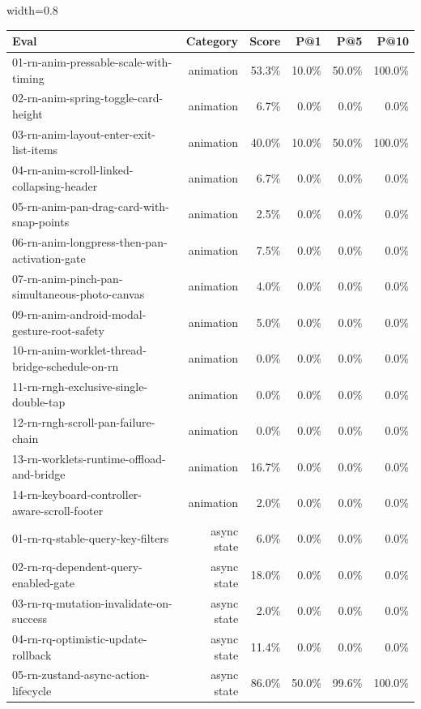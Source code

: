 \begin{table}[htbp]
\centering
\begin{adjustbox}{width=0.8\textwidth}
\begin{tabular}{lrrrrr}
\toprule
Eval & Category & Score & P@1 & P@5 & P@10 \\
\midrule
01-rn-anim-pressable-scale-with-timing & animation & 53.3\% & 10.0\% & 50.0\% & 100.0\% \\
02-rn-anim-spring-toggle-card-height & animation & 6.7\% & 0.0\% & 0.0\% & 0.0\% \\
03-rn-anim-layout-enter-exit-list-items & animation & 40.0\% & 10.0\% & 50.0\% & 100.0\% \\
04-rn-anim-scroll-linked-collapsing-header & animation & 6.7\% & 0.0\% & 0.0\% & 0.0\% \\
05-rn-anim-pan-drag-card-with-snap-points & animation & 2.5\% & 0.0\% & 0.0\% & 0.0\% \\
06-rn-anim-longpress-then-pan-activation-gate & animation & 7.5\% & 0.0\% & 0.0\% & 0.0\% \\
07-rn-anim-pinch-pan-simultaneous-photo-canvas & animation & 4.0\% & 0.0\% & 0.0\% & 0.0\% \\
09-rn-anim-android-modal-gesture-root-safety & animation & 5.0\% & 0.0\% & 0.0\% & 0.0\% \\
10-rn-anim-worklet-thread-bridge-schedule-on-rn & animation & 0.0\% & 0.0\% & 0.0\% & 0.0\% \\
11-rn-rngh-exclusive-single-double-tap & animation & 0.0\% & 0.0\% & 0.0\% & 0.0\% \\
12-rn-rngh-scroll-pan-failure-chain & animation & 0.0\% & 0.0\% & 0.0\% & 0.0\% \\
13-rn-worklets-runtime-offload-and-bridge & animation & 16.7\% & 0.0\% & 0.0\% & 0.0\% \\
14-rn-keyboard-controller-aware-scroll-footer & animation & 2.0\% & 0.0\% & 0.0\% & 0.0\% \\
01-rn-rq-stable-query-key-filters & async state & 6.0\% & 0.0\% & 0.0\% & 0.0\% \\
02-rn-rq-dependent-query-enabled-gate & async state & 18.0\% & 0.0\% & 0.0\% & 0.0\% \\
03-rn-rq-mutation-invalidate-on-success & async state & 2.0\% & 0.0\% & 0.0\% & 0.0\% \\
04-rn-rq-optimistic-update-rollback & async state & 11.4\% & 0.0\% & 0.0\% & 0.0\% \\
05-rn-zustand-async-action-lifecycle & async state & 86.0\% & 50.0\% & 99.6\% & 100.0\% \\

\end{tabular}
\end{adjustbox}
\end{table}
